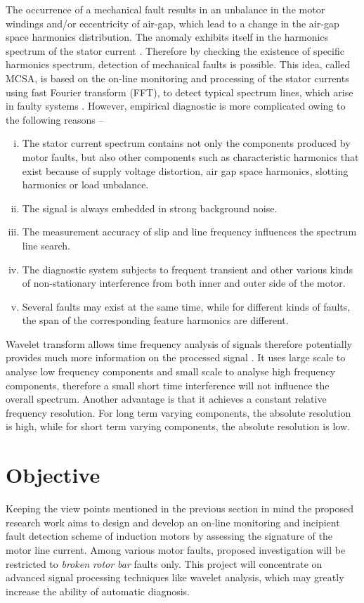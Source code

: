 \documentclass[a4paper,11pt]{report}
\begin{document}
The occurrence of a mechanical fault results in an unbalance in the motor windings and/or eccentricity of air-gap, which lead to a change in the air-gap space harmonics distribution. The anomaly exhibits itself in the harmonics spectrum of the stator current \cite{00897122-1}. Therefore by checking the existence of specific harmonics spectrum, detection of mechanical faults is possible. This idea, called MCSA, is based on the on-line monitoring and processing of the stator currents using fast Fourier transform (FFT), to detect typical spectrum lines, which arise in faulty systems \cite{00897122-6}. However, empirical diagnostic is more complicated owing to the following reasons --

\begin{enumerate}[(i)]
\item The stator current spectrum contains not only the components produced by motor faults, but also other components such as characteristic harmonics that exist because of supply voltage distortion, air gap space harmonics, slotting harmonics or load unbalance. 
\item The signal is always embedded in strong background noise. 
\item The measurement accuracy of slip and line frequency influences the spectrum line search. 
\item The diagnostic system subjects to frequent transient and other various kinds of non-stationary interference from both inner and outer side of the motor. 
\item Several faults may exist at the same time, while for different kinds of faults, the span of the corresponding feature harmonics are different.
\end{enumerate}

Wavelet transform allows time frequency analysis of signals therefore potentially provides much more information on the processed signal \cite{pswbook}. It uses large scale to analyse low frequency components and small scale to analyse high frequency components, therefore a small short time interference will not influence the overall spectrum. Another advantage is that it achieves a constant relative frequency resolution. For long term varying components, the absolute resolution is high, while for short term varying components, the absolute resolution is low.

\section{Objective} \label{obj}
Keeping the view points mentioned in the previous section in mind the proposed research work aims to design and develop an on-line monitoring and incipient fault detection scheme of induction motors by assessing the signature of the motor line current. Among various motor faults, proposed investigation will be restricted to \emph{broken rotor bar} faults only. This project will concentrate on advanced signal processing techniques like wavelet analysis, which may greatly increase the ability of automatic diagnosis.
\end{document}
